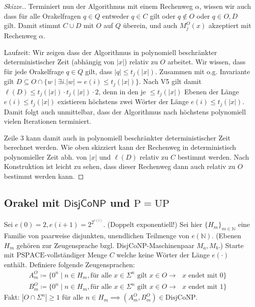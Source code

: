 \documentclass[nofonts]{uebung}
\def\P{\ensuremath{\mathrm{P}}}
\def\UP{\ensuremath{\mathrm{UP}}}
\def\DisjCoNP{\ensuremath{\mathrm{DisjCoNP}}}
\def\hDisjCoNP{\ensuremath{\mathsf{DisjCoNP}}}
\begin{document}
\begin{proof}[Skizze.]
    Terminiert nun der Algorithmus mit einem Rechenweg $\alpha$, wissen wir auch dass für alle Orakelfragen $q\in Q$ entweder $q\in C$ gilt oder $q\not\in O$ oder $q\in O, D$ gilt.
    Damit stimmt $C\cup D$ mit $O$ auf $Q$ überein, und auch $M_j^O(x)$ akzeptiert mit Rechenweg $\alpha$.

    Laufzeit: Wir zeigen dass der Algorithmus in polynomiell beschränkter deterministischer Zeit (abhängig von $|x|$) relativ zu $O$ arbeitet. 
    Wir wissen, dass für jede Orakelfrage $q\in Q$ gilt, dass $|q|\leq t_j(|x|)$.
    Zusammen mit o.g. Invariante gilt $D\subseteq O\cap \{w \mid \exists i.|w|=e(i)\leq t_j(|x|)\}$.
    Nach V5 gilt damit $\ell(D)\leq t_j(|x|)\cdot t_j(|x|)\cdot 2$, denn in den je $\leq t_j(|x|)$ Ebenen der Länge $e(i)\leq t_j(|x|)$ existieren höchstens zwei Wörter der Länge $e(i)\leq t_j(|x|)$.
    Damit folgt auch unmittelbar, dass der Algorithmus nach höchstens polynomiell vielen Iterationen terminiert.

    Zeile 3 kann damit auch in polynomiell beschränkter deterministischer Zeit berechnet werden. Wie oben skizziert kann der Rechenweg in deterministisch polynomieller Zeit abh. von $|x|$ und $\ell(D)$ relativ zu $C$ bestimmt werden.
    Nach Konstruktion ist leicht zu sehen, dass dieser Rechenweg dann auch relativ zu $O$ bestimmt werden kann.
\end{proof}

\clearpage
\subsection*{Orakel mit $\hDisjCoNP$ und $\P=\UP$}
\setcounter{theorem}{0}

Sei $e(0)=2, e(i+1)=2^{2^{e(i)}}$. (Doppelt exponentiell!) Sei hier $\{H_m\}_{m\in\mathbb N}$ eine Familie von paarweise disjunkten, unendlichen Teilmenge von $e(\mathbb N)$. (Ebenen $H_m$ gehören zur Zeugensprache bzgl. DisjCoNP-Maschinenpaar $M_a, M_b$.)
Starte mit $\mathrm{PSPACE}$-vollständiger Menge $C$ welche keine Wörter der Länge $e(\cdot)$ enthält.
Definiere folgende Zeugensprachen:
\begin{gather*}
    A_m^O \coloneqq \{ 0^n \mid n\in H_m, \text{für alle $x\in \Sigma^{n}$ gilt } x\in O \rightarrow \text{ $x$ endet mit $0$} \}\\
    B_m^O \coloneqq \{ 0^n \mid n\in H_m, \text{für alle $x\in \Sigma^{n}$ gilt } x\in O \rightarrow \text{ $x$ endet mit $1$} \}
\end{gather*}
Fakt: $|O\cap \Sigma^n|\geq 1$ für alle $n\in H_m \implies (A_m^O, B_m^O)\in\DisjCoNP$.
\medskip
\end{document}

